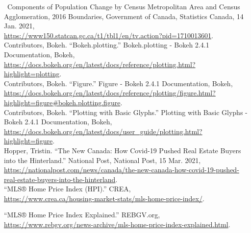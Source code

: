\documentclass[fontsize=11pt]{article}
\begin{document}
\quad \, \quad Components of Population Change by Census Metropolitan Area and Census Agglomeration, 2016 Boundaries, Government of Canada, Statistics Canada, 14 Jan. 2021,\\ \href{https://www150.statcan.gc.ca/t1/tbl1/en/tv.action?pid=1710013601}{https://www150.statcan.gc.ca/t1/tbl1/en/tv.action?pid=1710013601}. \\

\quad Contributors, Bokeh. “Bokeh.plotting.” Bokeh.plotting - Bokeh 2.4.1 Documentation, Bokeh, \\ \href{https://docs.bokeh.org/en/latest/docs/reference/plotting.html?highlight=plotting}{https://docs.bokeh.org/en/latest/docs/reference/plotting.html?highlight=plotting}. \\

\quad Contributors, Bokeh. “Figure.” Figure - Bokeh 2.4.1 Documentation, Bokeh, \\ \href{https://docs.bokeh.org/en/latest/docs/reference/plotting/figure.html?highlight=figure\#bokeh.plotting.figure}{https://docs.bokeh.org/en/latest/docs/reference/plotting/figure.html?highlight=figure\#bokeh.plotting.figure}. \\

\quad Contributors, Bokeh. “Plotting with Basic Glyphs.” Plotting with Basic Glyphs - Bokeh 2.4.1 Documentation, Bokeh,
\href{https://docs.bokeh.org/en/latest/docs/user\_guide/plotting.html?highlight=figure}{https://docs.bokeh.org/en/latest/docs/user\_guide/plotting.html?highlight=figure}.\\

\quad Hopper, Tristin. “The New Canada: How Covid-19 Pushed Real Estate Buyers into the Hinterland.” National Post, National Post, 15 Mar. 2021, \\ \href{https://nationalpost.com/news/canada/the-new-canada-how-covid-19-pushed-real-estate-buyers-into-the-hinterland}{https://nationalpost.com/news/canada/the-new-canada-how-covid-19-pushed-real-estate-buyers-into-the-hinterland}. \\

\quad “MLS® Home Price Index (HPI).” CREA,\\ \href{https://www.crea.ca/housing-market-stats/mls-home-price-index/}{https://www.crea.ca/housing-market-stats/mls-home-price-index/}.

\quad “MLS® Home Price Index Explained.” REBGV.org, \href{https://www.rebgv.org/news-archive/mls-home-price-index-explained.html}{https://www.rebgv.org/news-archive/mls-home-price-index-explained.html}. \\
\end{document}
